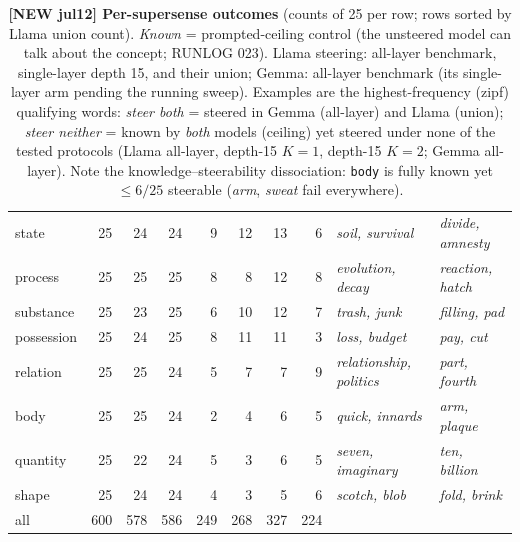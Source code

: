 \begin{table}[t]
\begin{tabular}{lrrrrrrrll}
state & 25 & 24 & 24 & 9 & 12 & 13 & 6 & \textit{soil, survival} & \textit{divide, amnesty} \\
process & 25 & 25 & 25 & 8 & 8 & 12 & 8 & \textit{evolution, decay} & \textit{reaction, hatch} \\
substance & 25 & 23 & 25 & 6 & 10 & 12 & 7 & \textit{trash, junk} & \textit{filling, pad} \\
possession & 25 & 24 & 25 & 8 & 11 & 11 & 3 & \textit{loss, budget} & \textit{pay, cut} \\
relation & 25 & 25 & 24 & 5 & 7 & 7 & 9 & \textit{relationship, politics} & \textit{part, fourth} \\
body & 25 & 25 & 24 & 2 & 4 & 6 & 5 & \textit{quick, innards} & \textit{arm, plaque} \\
quantity & 25 & 22 & 24 & 5 & 3 & 6 & 5 & \textit{seven, imaginary} & \textit{ten, billion} \\
shape & 25 & 24 & 24 & 4 & 3 & 5 & 6 & \textit{scotch, blob} & \textit{fold, brink} \\
\hline
all & 600 & 578 & 586 & 249 & 268 & 327 & 224 & & \\
\hline
\end{tabular}
\caption{\textbf{[NEW jul12] Per-supersense outcomes} (counts of 25 per row;
rows sorted by Llama union count). \emph{Known} = prompted-ceiling control (the
unsteered model can talk about the concept; RUNLOG 023). Llama steering:
all-layer benchmark, single-layer depth 15, and their union; Gemma: all-layer
benchmark (its single-layer arm pending the running sweep). Examples are the
highest-frequency (zipf) qualifying words: \emph{steer both} = steered in Gemma
(all-layer) and Llama (union); \emph{steer neither} = known by \emph{both}
models (ceiling) yet steered under none of the tested protocols (Llama
all-layer, depth-15 $K{=}1$, depth-15 $K{=}2$; Gemma all-layer). Note the knowledge--steerability
dissociation: \texttt{body} is fully known yet ${\le}6/25$ steerable
(\emph{arm}, \emph{sweat} fail everywhere).}
\label{tab:supersense_outcomes}
\end{table}

